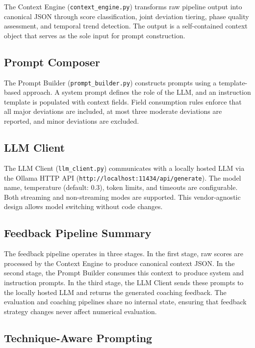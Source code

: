 The Context Engine (\texttt{context\_engine.py}) transforms raw pipeline output into canonical JSON through score classification, joint deviation tiering, phase quality assessment, and temporal trend detection. The output is a self-contained context object that serves as the sole input for prompt construction.


\subsection{Prompt Composer}

The Prompt Builder (\texttt{prompt\_builder.py}) constructs prompts using a template-based approach. A system prompt defines the role of the LLM, and an instruction template is populated with context fields. Field consumption rules enforce that all major deviations are included, at most three moderate deviations are reported, and minor deviations are excluded.


\subsection{LLM Client}

The LLM Client (\texttt{llm\_client.py}) communicates with a locally hosted LLM via the Ollama HTTP API (\texttt{http://localhost:11434/api/generate}). The model name, temperature (default: 0.3), token limits, and timeouts are configurable. Both streaming and non-streaming modes are supported. This vendor-agnostic design allows model switching without code changes.


\subsection{Feedback Pipeline Summary}

The feedback pipeline operates in three stages. In the first stage, raw scores are processed by the Context Engine to produce canonical context JSON. In the second stage, the Prompt Builder consumes this context to produce system and instruction prompts. In the third stage, the LLM Client sends these prompts to the locally hosted LLM and returns the generated coaching feedback. The evaluation and coaching pipelines share no internal state, ensuring that feedback strategy changes never affect numerical evaluation.


\subsection{Technique-Aware Prompting}

